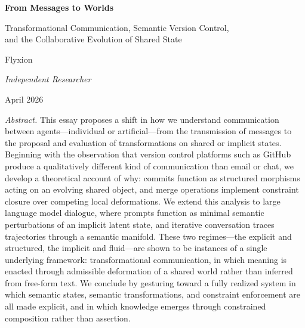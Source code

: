 \documentclass[12pt, letterpaper]{article}
\begin{document}
\begin{titlepage}
  \begin{center}
    \vspace*{2.5cm}

    {\fontsize{22}{28}\selectfont\bfseries\color{titleblue}
      From Messages to Worlds}

    \vspace{0.4cm}

    {\fontsize{14}{20}\selectfont\color{sectiongray}
      Transformational Communication, Semantic Version Control,\\
      and the Collaborative Evolution of Shared State}

    \vspace{1.8cm}

    {\large Flyxion}

    \vspace{0.3cm}

    {\normalsize\textit{Independent Researcher}}

    \vspace{0.3cm}

    {\normalsize April 2026}

    \vspace{3cm}

    \begin{minipage}{0.82\textwidth}
      \normalsize{}
      \textit{Abstract.} This essay proposes a shift in how we understand communication between agents---individual or artificial---from the transmission of messages to the proposal and evaluation of transformations on shared or implicit states. Beginning with the observation that version control platforms such as GitHub produce a qualitatively different kind of communication than email or chat, we develop a theoretical account of why: commits function as structured morphisms acting on an evolving shared object, and merge operations implement constraint closure over competing local deformations. We extend this analysis to large language model dialogue, where prompts function as minimal semantic perturbations of an implicit latent state, and iterative conversation traces trajectories through a semantic manifold. These two regimes---the explicit and structured, the implicit and fluid---are shown to be instances of a single underlying framework: transformational communication, in which meaning is enacted through admissible deformation of a shared world rather than inferred from free-form text. We conclude by gesturing toward a fully realized system in which semantic states, semantic transformations, and constraint enforcement are all made explicit, and in which knowledge emerges through constrained composition rather than assertion.
    \end{minipage}

  \end{center}
\end{titlepage}
\end{document}
